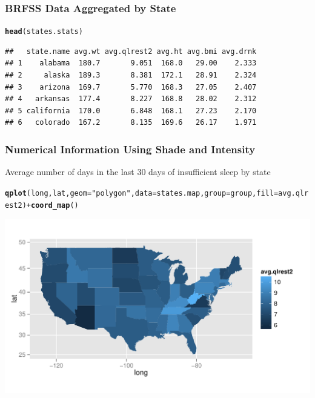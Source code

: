 \documentclass{beamer}\usepackage[]{graphicx}\usepackage[]{color}
\makeatletter
\newcommand{\hlstr}[1]{\textcolor[rgb]{0.192,0.494,0.8}{#1}}%
\newcommand{\hlopt}[1]{\textcolor[rgb]{0,0,0}{#1}}%
\newcommand{\hlstd}[1]{\textcolor[rgb]{0.345,0.345,0.345}{#1}}%
\newcommand{\hlkwc}[1]{\textcolor[rgb]{0.333,0.667,0.333}{#1}}%
\newcommand{\hlkwd}[1]{\textcolor[rgb]{0.737,0.353,0.396}{\textbf{#1}}}%
\newenvironment{kframe}{%
 \def\at@end@of@kframe{}%
 \ifinner\ifhmode%
  \def\at@end@of@kframe{\end{minipage}}%
  \begin{minipage}{\columnwidth}%
 \fi\fi%
 \def\FrameCommand##1{\hskip\@totalleftmargin \hskip-\fboxsep
 \colorbox{shadecolor}{##1}\hskip-\fboxsep
     \hskip-\linewidth \hskip-\@totalleftmargin \hskip\columnwidth}%
 \MakeFramed {\advance\hsize-\width
   \@totalleftmargin\z@ \linewidth\hsize
   \@setminipage}}%
 {\par\unskip\endMakeFramed%
 \at@end@of@kframe}
\newenvironment{knitrout}{}{} %
\makeatother
\begin{document}

\begin{frame}[fragile]
    \frametitle{BRFSS Data Aggregated by State}
    
    
    \small
\begin{knitrout}\footnotesize
{}\color{fgcolor}\begin{kframe}
\begin{alltt}
\hlkwd{head}\hlstd{(states.stats)}
\end{alltt}
\begin{verbatim}
##   state.name avg.wt avg.qlrest2 avg.ht avg.bmi avg.drnk
## 1    alabama  180.7       9.051  168.0   29.00    2.333
## 2     alaska  189.3       8.381  172.1   28.91    2.324
## 3    arizona  169.7       5.770  168.3   27.05    2.407
## 4   arkansas  177.4       8.227  168.8   28.02    2.312
## 5 california  170.0       6.848  168.1   27.23    2.170
## 6   colorado  167.2       8.135  169.6   26.17    1.971
\end{verbatim}
\end{kframe}
\end{knitrout}
    \normalsize
\end{frame}


\begin{frame}[fragile]
    \frametitle{Numerical Information Using Shade and Intensity}

Average number of days in the last 30 days of insufficient sleep by state

\small
\begin{knitrout}\footnotesize
{}\color{fgcolor}\begin{kframe}
\begin{alltt}
\hlkwd{qplot}\hlstd{(long, lat,} \hlkwc{geom}\hlstd{=}\hlstr{"polygon"}\hlstd{,} \hlkwc{data}\hlstd{=states.map,} \hlkwc{group}\hlstd{=group,} \hlkwc{fill}\hlstd{=avg.qlrest2)} \hlopt{+} \hlkwd{coord_map}\hlstd{()}
\end{alltt}
\end{kframe}
\includegraphics[width=\textwidth]{figure/ksleepdep} 

\end{knitrout}
    \normalsize
\end{frame}
\end{document}
